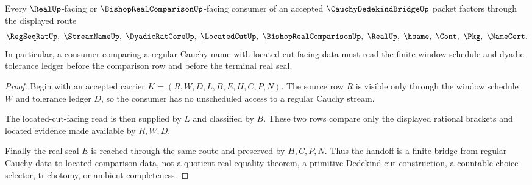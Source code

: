 \begin{theorem}\label{thm:cauchy-dedekind-bridge-real-comparison-handoff}
Every $\RealUp$-facing or $\BishopRealComparisonUp$-facing consumer of an accepted $\CauchyDedekindBridgeUp$ packet factors through the displayed route
$$
\RegSeqRatUp,\ \StreamNameUp,\ \DyadicRatCoreUp,\ \LocatedCutUp,\ \BishopRealComparisonUp,\ \RealUp,\ \hsame,\ \Cont,\ \Pkg,\ \NameCert .
$$
In particular, a consumer comparing a regular Cauchy name with located-cut-facing data must read the finite window schedule and dyadic tolerance ledger before the comparison row and before the terminal real seal.
\end{theorem}
\begin{proof}
Begin with an accepted carrier $K=(R,W,D,L,B,E,H,C,P,N)$. The source row $R$ is visible only through the window schedule $W$ and tolerance ledger $D$, so the consumer has no unscheduled access to a regular Cauchy stream.

The located-cut-facing read is then supplied by $L$ and classified by $B$. These two rows compare only the displayed rational brackets and located evidence made available by $R,W,D$.

Finally the real seal $E$ is reached through the same route and preserved by $H,C,P,N$. Thus the handoff is a finite bridge from regular Cauchy data to located comparison data, not a quotient real equality theorem, a primitive Dedekind-cut construction, a countable-choice selector, trichotomy, or ambient completeness.
\end{proof}




